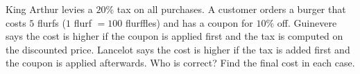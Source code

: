 King Arthur levies a $20\%$ tax on all purchases. A customer orders a burger that costs $5$ flurfs ($1$ flurf $=100$ flurffles) and has a coupon for $10\%$ off. Guinevere says the cost is higher if the coupon is applied first and the tax is computed on the discounted price. Lancelot says the cost is higher if the tax is added first and the coupon is applied afterwards. Who is correct? Find the final cost in each case.
